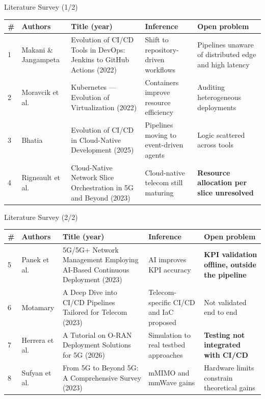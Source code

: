 \documentclass[aspectratio=169,11pt]{beamer}
\begin{document}
\begin{frame}{Literature Survey (1/2)}
  \scriptsize
  \renewcommand{\arraystretch}{1.3}
  \setlength{\tabcolsep}{3pt}
  \begin{tabular}{@{}p{}p{}p{}p{}p{}@{}}
    \toprule
    \textbf{\#} & \textbf{Authors} & \textbf{Title (year)} & \textbf{Inference} & \textbf{Open problem}\\
    \midrule
    1 & Makani \& Jangampeta
      & Evolution of CI/CD Tools in DevOps: Jenkins to GitHub Actions (2022)
      & Shift to repository-driven workflows
      & Pipelines unaware of distributed edge and high latency\\
    2 & Moravcik et al.
      & Kubernetes --- Evolution of Virtualization (2022)
      & Containers improve resource efficiency
      & Auditing heterogeneous deployments\\
    3 & Bhatia
      & Evolution of CI/CD in Cloud-Native Development (2025)
      & Pipelines moving to event-driven agents
      & Logic scattered across tools\\
    4 & Rigneault et al.
      & Cloud-Native Network Slice Orchestration in 5G and Beyond (2023)
      & Cloud-native telecom still maturing
      & \textbf{Resource allocation per slice unresolved}\\
    \bottomrule
  \end{tabular}
\end{frame}

\begin{frame}{Literature Survey (2/2)}
  \scriptsize
  \renewcommand{\arraystretch}{1.3}
  \setlength{\tabcolsep}{3pt}
  \begin{tabular}{@{}p{}p{}p{}p{}p{}@{}}
    \toprule
    \textbf{\#} & \textbf{Authors} & \textbf{Title (year)} & \textbf{Inference} & \textbf{Open problem}\\
    \midrule
    5 & Panek et al.
      & 5G/5G+ Network Management Employing AI-Based Continuous Deployment (2023)
      & AI improves KPI accuracy
      & \textbf{KPI validation offline, outside the pipeline}\\
    6 & Motamary
      & A Deep Dive into CI/CD Pipelines Tailored for Telecom (2023)
      & Telecom-specific CI/CD and IaC proposed
      & Not validated end to end\\
    7 & Herrera et al.
      & A Tutorial on O-RAN Deployment Solutions for 5G (2026)
      & Simulation to real testbed approaches
      & \textbf{Testing not integrated with CI/CD}\\
    8 & Sufyan et al.
      & From 5G to Beyond 5G: A Comprehensive Survey (2023)
      & mMIMO and mmWave gains
      & Hardware limits constrain theoretical gains\\
    \bottomrule
  \end{tabular}
\end{frame}
\end{document}
